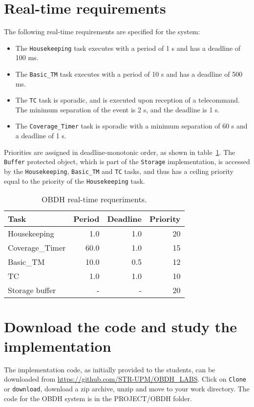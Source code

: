 \section{Real-time requirements}

The following real-time requirements are specified for the system:
\begin{itemize}
\item The {\tt Housekeeping} task executes with a period of 1 s and has a deadline of 100 ms.
\item The {\tt Basic\_TM} task executes with a period of 10 s and has a deadline of 500 ms.
\item The {\tt TC} task is sporadic, and is executed upon reception of a telecommand. The minimum separation of the event is 2 s, and the deadline is 1 s.
\item The {\tt Coverage\_Timer} task is sporadic with a minimum separation of 60 s and a deadline of 1 s.
\end{itemize}
Priorities are assigned in deadline-monotonic order, as shown in table~\ref{tb:obdh-requeriments}. The {\tt Buffer} protected object, which is part of the {\tt Storage} implementation, is accessed by the {\tt Housekeeping}, {\tt Basic\_TM} and {\tt TC} tasks, and thus has a ceiling priority equal to the priority of the {\tt Housekeeping} task.

\begin{table}[htb]
\begin{center}
\begin{tabular}{|l|r|r|r|} \hline
Task & Period & Deadline & Priority\\ \hline
Housekeeping & 1.0 & 1.0 & 20 \\
Coverage\_Timer & 60.0 & 1.0 & 15 \\
Basic\_TM & 10.0 & 0.5 & 12 \\
TC & 1.0 & 1.0 & 10 \\
Storage buffer & - & - & 20 \\ \hline
\end{tabular}
\caption{OBDH real-time requeriments.}
\label{tb:obdh-requeriments}
\end{center}
\end{table}

\section{Download the code and study the implementation}


The implementation code, as initially provided to the students, can be downloaded from \url{https://github.com/STR-UPM/OBDH\_LABS}. Click on {\tt Clone} or {\tt download}, download a zip archive, unzip and move to your work directory. The code for the OBDH system is in the PROJECT/OBDH folder.

